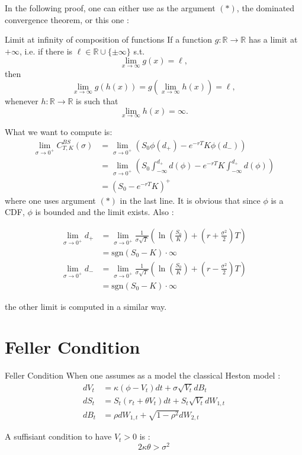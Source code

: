 In the following proof, one can either use as the argument $(*)$, the dominated convergence theorem, or this one :

\begin{theoreme}{Limit at infinity of composition of functions}
If a function $g:\mathbb R\to \mathbb R$ has a limit at $+\infty $, i.e. if there is $\ell\in\mathbb R\cup\{\pm \infty \}$ s.t. $$\lim_{x\to \infty }g(x)=\ell,$$
then $$\lim_{x\to \infty }g(h(x))=g\left(\lim_{x\to \infty }h(x)\right)=\ell,$$
whenever $h:\mathbb R\to \mathbb R$ is such that $$\lim_{x\to \infty }h(x)=\infty .$$ 
\end{theoreme}


\begin{demo}{}{}
What we want to compute is:
\begin{align*}
\lim_{ \sigma \to 0^+} C_{T,K}^{BS} (\sigma) 
&=  \lim_{ \sigma \to 0^+} \left ( S_0 \phi ( d_+ ) - e^{-r T } K  \phi( d_- ) \right ) \\
&= \lim_{ \sigma \to 0^+} \left ( S_0 \int_{- \infty}^{d_+} d (\phi) - e^{-r T } K  \int_{- \infty}^{d_+} d (\phi)  \right )\\
&=  (S_0 - e^{-r T } K )^+
\end{align*}
where one uses argument $(*)$ in the last line. It is obvious that since $\phi$ is a CDF, $\phi$ is bounded and the limit exists. 
Also :

\begin{align*}
\lim_{ \sigma \to 0^+} d_{+} &= \lim_{ \sigma \to 0^+} \frac{1}{\sigma \sqrt{T}  } \left ( \ln(\frac{S_0}{K}) + \left ( r + \frac{\sigma^2}{2} \right ) T \right ) \\
&= \text{sgn}(S_0 - K) \cdot \infty \\
\lim_{ \sigma \to 0^+} d_{-} &= \lim_{ \sigma \to 0^+} \frac{1}{\sigma \sqrt{T}  } \left ( \ln(\frac{S_0}{K}) + \left ( r - \frac{\sigma^2}{2} \right ) T \right ) \\
&= \text{sgn}(S_0 - K) \cdot \infty 
\end{align*}

the other limit is computed in a similar way.
\end{demo}


\chapter{Feller Condition}
\label{feller_condition}
\begin{theoreme}{Feller Condition}
When one assumes as a model the classical Heston model :
\begin{align}
d V_t &= \kappa  (  \phi - V_t ) dt + \sigma \sqrt{V_t} dB_t \\
d S_t &= S_t ( r_t + \theta V_t ) dt + S_t \sqrt{V_t} d W_{1,t} \\
d B_t &= \rho d W_{1,t} + \sqrt{1- \rho^2 } d W_{2,t} 
\end{align}

A suffisiant condition to have $V_t > 0$ is :
$$ 2 \kappa  \theta > \sigma^2 $$

\end{theoreme}
